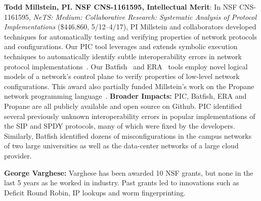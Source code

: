 \medskip
\noindent
{\bf Todd Millstein, PI. NSF CNS-1161595, Intellectual Merit}: In NSF CNS-1161595, {\em NeTS: Medium: Collaborative Research: Systematic Analysis of Protocol Implementations} (\$446,860, 5/12--4/17), PI Millstein and collaborators developed techniques for automatically testing and verifying properties of network protocols and configurations.  Our PIC tool leverages and extends symbolic execution techniques to automatically identify subtle interoperability errors in network protocol implementations~\cite{DBLP:conf/nsdi/PedrosaFKGMM15}.  Our Batfish~\cite{batfish} and ERA~\cite{era} tools employ novel logical models of a network's control plane to verify properties of low-level network configurations.  This award also partially funded Millstein's work on the Propane network programming language~\cite{beckett+:propane}. 
%
{\bf Broader Impacts:} PIC, Batfish, ERA and Propane are all publicly available and open source on Github.  PIC identified several previously unknown interoperability errors in popular implementations of the SIP and SPDY protocols, many of which were fixed by the developers.  Similarly, Batfish identified dozens of misconfigurations in the campus networks of two large universities as well as the data-center networks of a large cloud provider.

\noindent
{\bf George Varghese:} Varghese has been awarded 10 NSF grants, but none in the last 5 years 
as he worked in industry.  Past grants led to innovations such as Deficit Round Robin, IP lookups and worm fingerprinting.

